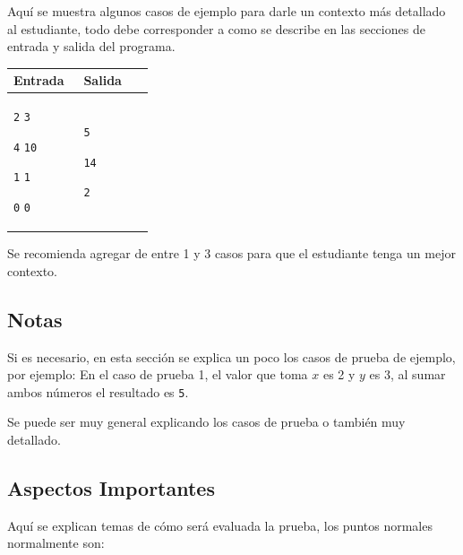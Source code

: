 \documentclass[11pt,a4paper]{article}
\newenvironment{sample}[2]{
  \begin{tcolorbox}[title=Prueba \##1, colback=white, colframe=black, sharp corners,
    fonttitle=\bfseries, breakable]
    \begin{tabular}{|p{0.45\linewidth}|p{0.45\linewidth}|}
      \hline
      \textbf{Entrada} & \textbf{Salida} \\
      \hline
      }{\\ \hline
    \end{tabular}
  \end{tcolorbox}
}
\begin{document}
Aquí se muestra algunos casos de ejemplo para darle un contexto más detallado al estudiante, todo debe corresponder a como se describe en las secciones de entrada y salida del programa.

\begin{sample}{1}{}
  \texttt{2} \texttt{3}

  \texttt{4} \texttt{10}

  \texttt{1} \texttt{1}

  \texttt{0} \texttt{0}

  &
  \texttt{5}

  \texttt{14}

  \texttt{2}

\end{sample}

Se recomienda agregar de entre 1 y 3 casos para que el estudiante tenga un mejor contexto. 

\subsection*{Notas}

Si es necesario, en esta sección se explica un poco los casos de prueba de ejemplo, por ejemplo: En el caso de prueba 1, el valor que toma \(x\) es 2 y \(y\) es 3, al sumar ambos números el resultado es \texttt{5}. 

Se puede ser muy general explicando los casos de prueba o también muy detallado.

\subsection*{Aspectos Importantes}

Aquí se explican temas de cómo será evaluada la prueba, los puntos normales normalmente son:
\end{document}
